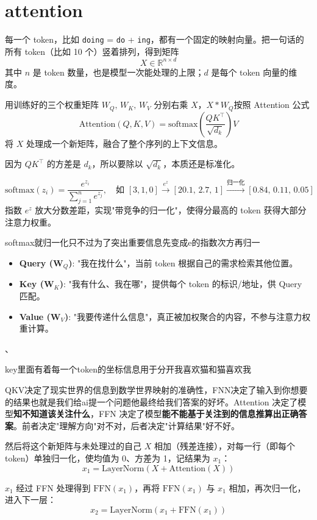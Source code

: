 \section{attention}
\begin{note}
每一个 token，比如 \texttt{doing} = \texttt{do} + \texttt{ing}，都有一个固定的映射向量。把一句话的所有 token（比如 10 个）竖着排列，得到矩阵
\[
X \in \mathbb{R}^{n \times d}
\]
其中 $n$ 是 token 数量，也是模型一次能处理的上限；$d$ 是每个 token 向量的维度。

用训练好的三个权重矩阵 $W_Q,\, W_K,\, W_V$ 分别右乘 $X$，$X*W_Q$按照 Attention 公式
\[
\mathrm{Attention}(Q,K,V) = \mathrm{softmax}\!\left(\frac{QK^\top}{\sqrt{d_k}}\right)V
\]
将 $X$ 处理成一个新矩阵，融合了整个序列的上下文信息。
\begin{dxtips}
  \begin{note}
因为 $QK^\top$ 的方差是 $d_k$，所以要除以 $\sqrt{d_k}$，本质还是标准化。
\end{note}
\end{dxtips}
\begin{definition}[Softmax]
\[
\mathrm{softmax}(z_i) = \frac{e^{z_i}}{\sum_{j=1}^{n} e^{z_j}},\quad
\text{如 } [3,1,0] \xrightarrow{e^z} [20.1,\,2.7,\,1] \xrightarrow{\text{归一化}} [0.84,\,0.11,\,0.05]
\]
指数 $e^z$ 放大分数差距，实现"带竞争的归一化"，使得分最高的 token 获得大部分注意力权重。
\end{definition}
\begin{dxtips}
    softmax就归一化只不过为了突出重要信息先变成e的指数次方再归一
\end{dxtips}
\begin{itemize}
    \item \textbf{Query ($\mathbf{W}_Q$)}: "我在找什么"，当前 token 根据自己的需求检索其他位置。
    \item \textbf{Key ($\mathbf{W}_K$)}: "我有什么、我在哪"，提供每个 token 的标识/地址，供 Query 匹配。
    \item \textbf{Value ($\mathbf{W}_V$)}: "我要传递什么信息"，真正被加权聚合的内容，不参与注意力权重计算。
\end{itemize}

、


\begin{dxtips}
    key里面有着每一个token的坐标信息用于分开我喜欢猫和猫喜欢我
\end{dxtips}
\begin{dxtips}
  QKV决定了现实世界的信息到数学世界映射的准确性，FNN决定了输入到你想要的结果也就是我们给ai提一个问题他最终给我们答案的好坏。Attention 决定了模型\textbf{知不知道该关注什么}，FFN 决定了模型\textbf{能不能基于关注到的信息推算出正确答案}。前者决定"理解方向"对不对，后者决定"计算结果"好不好。
\end{dxtips}
然后将这个新矩阵与未处理过的自己 $X$ 相加（残差连接），对每一行（即每个 token）单独归一化，使均值为 0、方差为 1，记结果为 $x_1$：
\[
x_1 = \mathrm{LayerNorm}(X + \mathrm{Attention}(X))
\]

$x_1$ 经过 FFN 处理得到 $\mathrm{FFN}(x_1)$，再将 $\mathrm{FFN}(x_1)$ 与 $x_1$ 相加，再次归一化，进入下一层：
\[
x_2 = \mathrm{LayerNorm}(x_1 + \mathrm{FFN}(x_1))
\]
\end{note}
